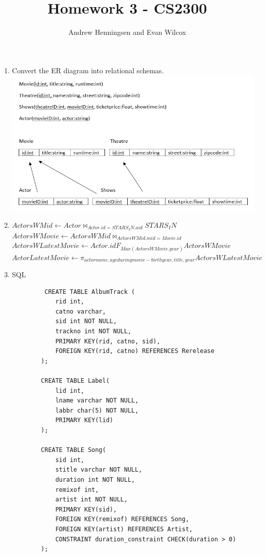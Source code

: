 \documentclass[12pt]{article}
\begin{document}
 
\title{Homework 3 - CS2300}
\author{Andrew Henningsen and Evan Wilcox}
\maketitle

\begin{enumerate}
    \item Convert the ER diagram into relational schemas.\\
        \includegraphics[scale=.9]{1}
    \item $ActorsWMid \leftarrow Actor \bowtie_{Actor.id = STARS_IN.aid} STARS_IN$ \\
          $ActorsWMovie \leftarrow ActorsWMid \bowtie_{ActorsWMid.mid=Movie.id}$ \\
          $ActorsWLatestMovie \leftarrow Actor.id F_{Max(ActorsWMovie.year)} ActorsWMovie$ \\
          $ActorLatestMovie \leftarrow \pi_{actorname, ageduringmovie - birthyear, title, year} ActorsWLatestMovie$ \\
    \newpage
    \item SQL 
    \begin{verbatim}
         CREATE TABLE AlbumTrack (
            rid int,
            catno varchar,
            sid int NOT NULL,
            trackno int NOT NULL,
            PRIMARY KEY(rid, catno, sid),
            FOREIGN KEY(rid, catno) REFERENCES Rerelease
        );

        CREATE TABLE Label(
            lid int, 
            lname varchar NOT NULL,
            labbr char(5) NOT NULL,
            PRIMARY KEY(lid)
        );

        CREATE TABLE Song(
            sid int, 
            stitle varchar NOT NULL, 
            duration int NOT NULL,
            remixof int, 
            artist int NOT NULL,
            PRIMARY KEY(sid),
            FOREIGN KEY(remixof) REFERENCES Song,
            FOREIGN KEY(artist) REFERENCES Artist,
            CONSTRAINT duration_constraint CHECK(duration > 0)
        );


\end{verbatim}
\end{enumerate}
\end{document}

